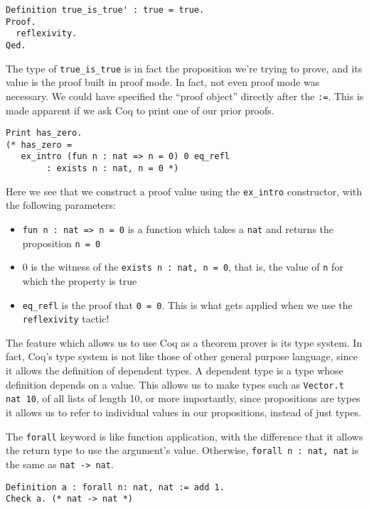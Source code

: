 \begin{verbatim}
Definition true_is_true' : true = true.
Proof.
  reflexivity.
Qed.
\end{verbatim}

The type of \texttt{true_is_true} is in fact the proposition we're trying to prove, and its 
value is the proof built in proof mode. In fact, not even proof mode was necessary. We could have 
specified the ``proof object'' directly after the \texttt{:=}. This is made apparent if we
ask Coq to print one of our prior proofs.

\begin{verbatim}
Print has_zero. 
(* has_zero = 
   ex_intro (fun n : nat => n = 0) 0 eq_refl
        : exists n : nat, n = 0 *)
\end{verbatim}

Here we see that we construct a proof value using the \texttt{ex_intro} constructor, with the
following parameters:
\begin{itemize}
    \item \texttt{fun n : nat => n = 0} is a function which takes a \texttt{nat} and returns the proposition \texttt{n = 0}
    \item 0 is the witness of the \texttt{exists n : nat, n = 0}, that is, the value of \texttt{n} for which the property is true
    \item \texttt{eq_refl} is the proof that \texttt{0 = 0}. This is what gets applied when we use the \texttt{reflexivity} tactic!
\end{itemize}

The feature which allows us to use Coq as a theorem prover is its type system. In fact, Coq's type system
is not like those of other general purpose language, since it allows the definition of dependent types. A
dependent type is a type whose definition depends on a value. This allows us to make types such as 
\texttt{Vector.t nat 10}, of all lists of length 10, or more importantly, since propositions are
types it allows us to refer to individual values in our propositions, instead of just types.

The \texttt{forall} keyword is like function application, with the difference that it allows the
return type to use the argument's value. Otherwise, \texttt{forall n : nat, nat} is the same as
\texttt{nat -> nat}.

\begin{verbatim}
Definition a : forall n: nat, nat := add 1.
Check a. (* nat -> nat *)
\end{verbatim}

